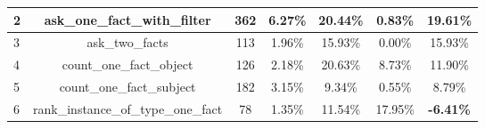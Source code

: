 \begin{table}[h!]
{\begin{tabular}{|l|c|cc|cc|c|}
    2                            & ask\_one\_fact\_with\_filter                                                                                           & 362                                                 & 6.27\%                                                                          & 20.44\%                                                                                                    & 0.83\%                                                                                 & 19.61\%                                 \\ \hline
    3                            & ask\_two\_facts                                                                                                        & 113                                                 & 1.96\%                                                                          & 15.93\%                                                                                                    & 0.00\%                                                                                 & 15.93\%                                 \\ \hline
    4                            & count\_one\_fact\_object                                                                                               & 126                                                 & 2.18\%                                                                          & 20.63\%                                                                                                    & 8.73\%                                                                                 & 11.90\%                                 \\ \hline
    5                            & count\_one\_fact\_subject                                                                                              & 182                                                 & 3.15\%                                                                          & 9.34\%                                                                                                     & 0.55\%                                                                                 & 8.79\%                                  \\ \hline
    6                            & rank\_instance\_of\_type\_one\_fact                                                                                    & 78                                                  & 1.35\%                                                                          & 11.54\%                                                                                                    & 17.95\%                                                                                & \textbf{-6.41\%}                        \\ \hline

\end{tabular}}
\end{table}
